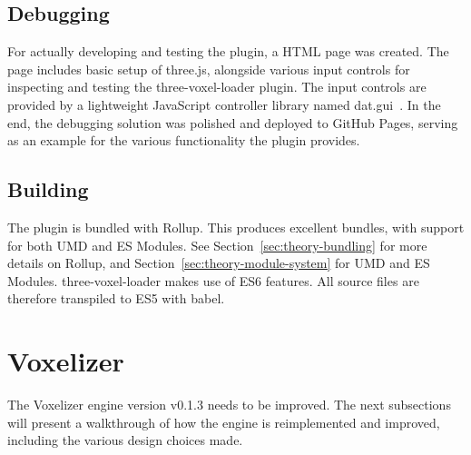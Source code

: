 \subsection{Debugging}
For actually developing and testing the plugin, a HTML page was created. The page includes basic setup of three.js, alongside various input controls for inspecting and testing the three-voxel-loader plugin. The input controls are provided by a lightweight JavaScript controller library named dat.gui~\cite{dat.gui}. In the end, the debugging solution was polished and deployed to GitHub Pages, serving as an example for the various functionality the plugin provides.

\subsection{Building}
The plugin is bundled with Rollup. This produces excellent bundles, with support for both UMD and ES Modules. See Section~\ref{sec:theory-bundling} for more details on Rollup, and Section~\ref{sec:theory-module-system} for UMD and ES Modules. three-voxel-loader makes use of ES6 features. All source files are therefore transpiled to ES5 with babel.

\section{Voxelizer}
The Voxelizer engine version v0.1.3 needs to be improved. The next subsections will present a walkthrough of how the engine is reimplemented and improved, including the various design choices made.

